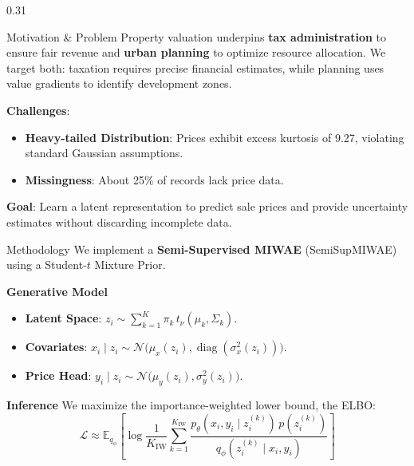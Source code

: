 \documentclass[final,t]{beamer}
\begin{document}
\begin{frame}{}
  \vspace{-1.5cm}
  
  \begin{columns}[t]
    \begin{column}{0.31\paperwidth}
      \begin{block}{Motivation \& Problem}
        Property valuation underpins \textbf{tax administration} to ensure fair revenue and \textbf{urban planning} to optimize resource allocation. We target both: taxation requires precise financial estimates, while planning uses value gradients to identify development zones.
        
        \textbf{Challenges}:
        \begin{itemize}
          \item \textbf{Heavy-tailed Distribution}: Prices exhibit excess kurtosis of 9.27, violating standard Gaussian assumptions.
          \item \textbf{Missingness}: About 25\% of records lack price data.
        \end{itemize}

        \textbf{Goal}: Learn a latent representation to predict sale prices and provide uncertainty estimates without discarding incomplete data.
      \end{block}

      \begin{block}{Methodology}
        We implement a \textbf{Semi-Supervised MIWAE} (SemiSupMIWAE) using a Student-$t$ Mixture Prior.

        \textbf{Generative Model}
        \begin{itemize}
          \item \textbf{Latent Space}: $z_i \sim \sum_{k=1}^K \pi_k \, t_\nu(\mu_k, \Sigma_k)$.
          \item \textbf{Covariates}: $x_i \mid z_i \sim \mathcal{N}\big(\mu_x(z_i), \operatorname{diag}(\sigma^2_x(z_i))\big)$.
          \item \textbf{Price Head}: $y_i \mid z_i \sim \mathcal{N}\big(\mu_y(z_i), \sigma^2_y(z_i)\big)$.
        \end{itemize}

        \textbf{Inference}
        We maximize the importance-weighted lower bound, the ELBO:
        \[
        \mathcal{L} \approx \mathbb{E}_{q_\phi} \left[ \log \frac{1}{K_{\text{IW}}} \sum_{k=1}^{K_{\text{IW}}} \frac{p_\theta(x_i, y_i \mid z_i^{(k)}) \, p(z_i^{(k)})}{q_\phi(z_i^{(k)} \mid x_i, y_i)} \right]
        \]
      \end{block}


\end{column}
\end{columns}
\end{frame}
\end{document}
